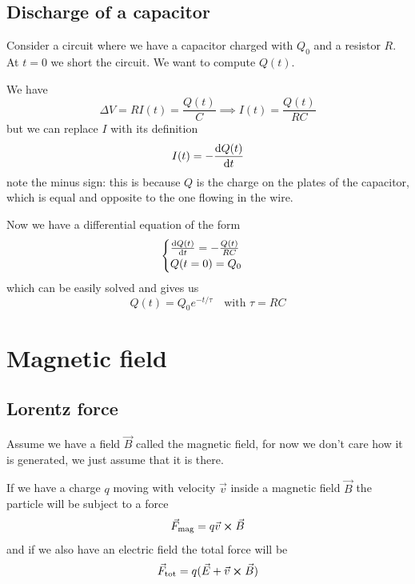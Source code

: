 \documentclass[12pt]{extarticle}
\begin{document}
\subsection{Discharge of a capacitor}

Consider a circuit where we have a capacitor charged with $Q_0$ and a resistor $R$.
At $t = 0$ we short the circuit.
We want to compute $Q(t)$.

We have
\begin{equation}
    \Delta V = R I(t) = \frac{Q(t)}{C} \implies I(t) = \frac{Q(t)}{RC}
\end{equation}
but we can replace $I$ with its definition
\begin{equation}
    I(t)= -\dv{Q(t)}{t}
\end{equation}
note the minus sign: this is because $Q$ is the charge on the plates of the capacitor,
which is equal and opposite to the one flowing in the wire.

Now we have a differential equation of the form
\begin{equation}
    \begin{cases}
        \dv{Q(t)}{t} = - \frac{Q(t)}{RC} \\
        Q(t = 0) = Q_0
    \end{cases}
\end{equation}
which can be easily solved and gives us
\begin{equation}
    Q(t) = Q_0 e^{- t/\tau} \quad \text{with } \tau = RC
\end{equation}

\section{Magnetic field}

\subsection{Lorentz force}

Assume we have a field $\vec B$ called the magnetic field,
for now we don't care how it is generated, we just assume that it is there.

If we have a charge $q$ moving with velocity $\vec v$ inside a magnetic field $\vec B$
the particle will be subject to a force
\begin{equation}
    \vec F_\text{mag} = q \vec v \cross \vec B
\end{equation}
and if we also have an electric field the total force will be
\begin{equation}
    \vec F_\text{tot} = q (\vec E + \vec v \cross \vec B)
\end{equation}
\end{document}
